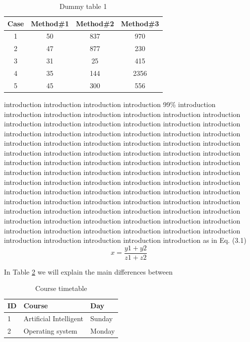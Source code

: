 \begin{table}[h]
\caption{Dummy table 1}
\begin{center}
\begin{tabular}{c c c c}
\hline\hline
Case & Method\#1 & Method\#2 & Method\#3 \\ [0.5ex] %
\hline
1&50&837&970 \\
2&47&877&230 \\
3&31&25 &415 \\
4 & 35 & 144 & 2356 \\
5 & 45 & 300 & 556 \\ [1ex]		%
\hline
\end{tabular}
\end{center}
\label{tab:dum1}
\end{table}
 
introduction introduction introduction introduction 99\% introduction introduction introduction introduction introduction introduction introduction introduction introduction introduction introduction introduction introduction introduction introduction introduction introduction introduction introduction introduction introduction introduction introduction introduction introduction introduction introduction introduction introduction introduction introduction introduction introduction introduction introduction introduction introduction introduction introduction introduction introduction introduction introduction introduction introduction introduction introduction introduction introduction introduction introduction introduction introduction introduction introduction introduction introduction introduction introduction introduction introduction introduction introduction introduction introduction introduction introduction introduction introduction introduction introduction introduction introduction introduction introduction introduction introduction introduction introduction introduction introduction introduction introduction introduction as in Eq. (3.1)
\begin{equation}
x=\frac{y1+y2}{z1+z2}    
\end{equation}



In Table \ref{T10} we will explain the main differences between

\begin{table}[h]
\caption{Course timetable}
\begin{center}
\begin{tabular}{lll}
\hline
ID & Course & Day \\ \hline
1 & Artificial Intelligent & Sunday \\
2 & Operating system & Monday \\ \hline
\end{tabular}
\end{center}
\label{T10}
\end{table}

